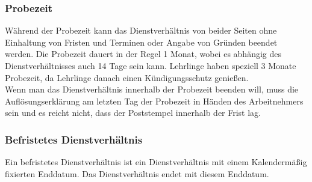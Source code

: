 \documentclass{article}
\begin{document}
	\subsubsection{Probezeit}
	Während der Probezeit kann das Dienstverhältnis von beider Seiten ohne Einhaltung von Fristen und Terminen oder Angabe von Gründen beendet werden. Die Probezeit dauert in der Regel 1 Monat, wobei es abhängig des Dienstverhältnisses auch 14 Tage sein kann. Lehrlinge haben speziell 3 Monate Probezeit, da Lehrlinge danach einen Kündigungsschutz genießen. \\
	Wenn man das Dienstverhältnis innerhalb der Probezeit beenden will, muss die Auflösungserklärung am letzten Tag der Probezeit in Händen des Arbeitnehmers sein und es reicht nicht, dass der Poststempel innerhalb der Frist lag.
	\subsubsection{Befristetes Dienstverhältnis}
	Ein befristetes Dienstverhältnis ist ein Dienstverhältnis mit einem Kalendermäßig fixierten Enddatum. Das Dienstverhältnis endet mit diesem Enddatum.
\end{document}

